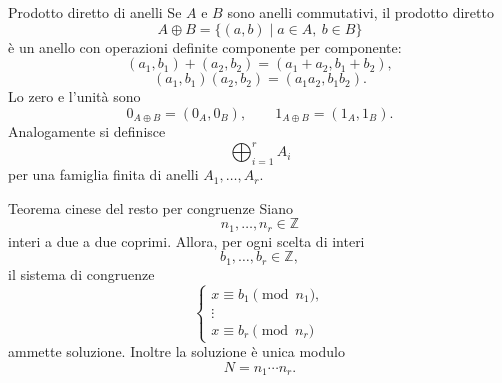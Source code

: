 \documentclass[a4paper]{article}
\begin{document}
\begin{radioactive}
\begin{snippetexample}{Prodotto diretto di anelli}
    Se \(A\) e \(B\) sono anelli commutativi, il prodotto diretto
    \[
        A\oplus B
        =
        \{(a,b)\mid a\in A,\ b\in B\}
    \]
    è un anello con operazioni definite componente per componente:
    \[
        (a_1,b_1)+(a_2,b_2)
        =
        (a_1+a_2,b_1+b_2),
    \]
    \[
        (a_1,b_1)(a_2,b_2)
        =
        (a_1a_2,b_1b_2).
    \]
    Lo zero e l'unità sono
    \[
        0_{A\oplus B}=(0_A,0_B),
        \qquad
        1_{A\oplus B}=(1_A,1_B).
    \]
    Analogamente si definisce
    \[
        \bigoplus_{i=1}^r A_i
    \]
    per una famiglia finita di anelli \(A_1,\ldots,A_r\).
\end{snippetexample}
\end{radioactive}

\begin{radioactive}
\begin{snippetcorollary}{Teorema cinese del resto per congruenze}
    Siano
    \[
        n_1,\ldots,n_r\in\mathbb{Z}
    \]
    interi a due a due coprimi. Allora, per ogni scelta di interi
    \[
        b_1,\ldots,b_r\in\mathbb{Z},
    \]
    il sistema di congruenze
    \[
        \begin{cases}
            x\equiv b_1 \pmod{n_1},\\
            \vdots\\
            x\equiv b_r \pmod{n_r}
        \end{cases}
    \]
    ammette soluzione. Inoltre la soluzione è unica modulo
    \[
        N=n_1\cdots n_r.
    \]
\end{snippetcorollary}
\end{radioactive}
\end{document}
